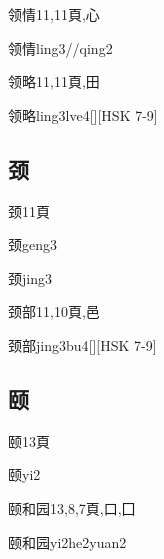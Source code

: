 \begin{Entry}{领情}{11,11}{⾴,⼼}
  \begin{Phonetics}{领情}{ling3//qing2}
  \end{Phonetics}
\end{Entry}

\begin{Entry}{领略}{11,11}{⾴,⽥}
  \begin{Phonetics}{领略}{ling3lve4}[][HSK 7-9]
  \end{Phonetics}
\end{Entry}

\subsection*{颈}

\begin{Entry}{颈}{11}{⾴}
  \begin{Phonetics}{颈}{geng3}
  \end{Phonetics}
  \begin{Phonetics}{颈}{jing3}
  \end{Phonetics}
\end{Entry}

\begin{Entry}{颈部}{11,10}{⾴,⾢}
  \begin{Phonetics}{颈部}{jing3bu4}[][HSK 7-9]
  \end{Phonetics}
\end{Entry}

\subsection*{颐}

\begin{Entry}{颐}{13}{⾴}
  \begin{Phonetics}{颐}{yi2}
  \end{Phonetics}
\end{Entry}

\begin{Entry}{颐和园}{13,8,7}{⾴,⼝,⼞}
  \begin{Phonetics}{颐和园}{yi2he2yuan2}
  \end{Phonetics}
\end{Entry}

